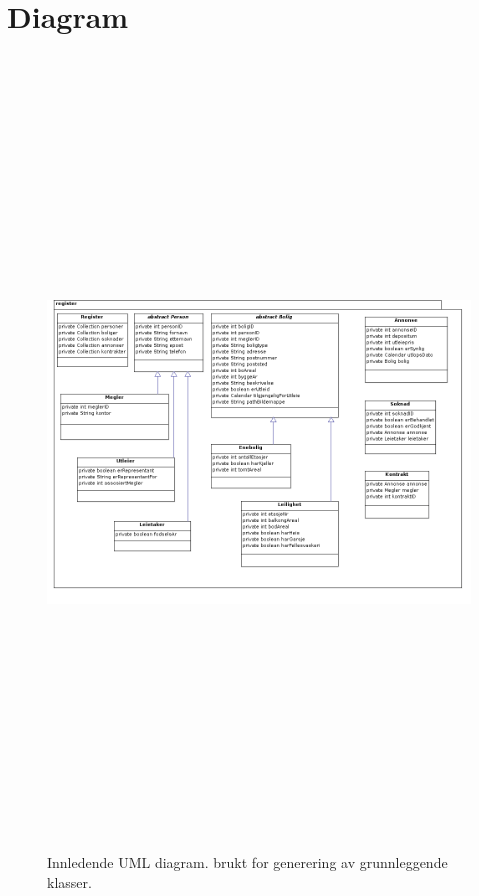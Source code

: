 \chapter{Diagram} \label{appendix:diagram}


\begin{figure}[ht]
\begin{center}
 \includegraphics[angle=90, height=21cm]{./img/appendix/diagram/klassestruktur_uml.png}
 \caption[UML]{Innledende UML diagram. brukt for generering av grunnleggende klasser.}
 \label{fig:uml_diag}
 \end{center}
\end{figure}


